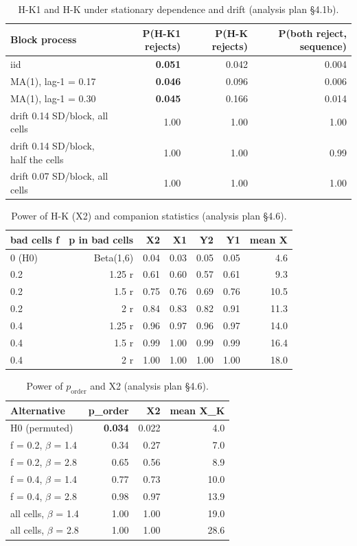 \begin{table}[htbp]
\centering\footnotesize
\caption{H-K1 and H-K under stationary dependence and drift (analysis plan \S4.1b).}\label{tab:sim0}
\begin{tabular}{lrrr}
\toprule
Block process & P(H-K1 rejects) & P(H-K rejects) & P(both reject, sequence) \\
\midrule
iid & \textbf{0.051} & 0.042 & 0.004 \\
MA(1), lag-1 = 0.17 & \textbf{0.046} & 0.096 & 0.006 \\
MA(1), lag-1 = 0.30 & \textbf{0.045} & 0.166 & 0.014 \\
drift 0.14 SD/block, all cells & 1.00 & 1.00 & 1.00 \\
drift 0.14 SD/block, half the cells & 1.00 & 1.00 & 0.99 \\
drift 0.07 SD/block, all cells & 1.00 & 1.00 & 1.00 \\
\bottomrule
\end{tabular}
\end{table}
\begin{table}[htbp]
\centering\footnotesize
\caption{Power of H-K (X2) and companion statistics (analysis plan \S4.6).}\label{tab:sim1}
\begin{tabular}{lrrrrrr}
\toprule
bad cells f & p in bad cells & X2 & X1 & Y2 & Y1 & mean X \\
\midrule
0 (H0) & Beta(1,6) & 0.04 & 0.03 & 0.05 & 0.05 & 4.6 \\
0.2 & 1.25 r & 0.61 & 0.60 & 0.57 & 0.61 & 9.3 \\
0.2 & 1.5 r & 0.75 & 0.76 & 0.69 & 0.76 & 10.5 \\
0.2 & 2 r & 0.84 & 0.83 & 0.82 & 0.91 & 11.3 \\
0.4 & 1.25 r & 0.96 & 0.97 & 0.96 & 0.97 & 14.0 \\
0.4 & 1.5 r & 0.99 & 1.00 & 0.99 & 0.99 & 16.4 \\
0.4 & 2 r & 1.00 & 1.00 & 1.00 & 1.00 & 18.0 \\
\bottomrule
\end{tabular}
\end{table}
\begin{table}[htbp]
\centering\footnotesize
\caption{Power of $p_{\mathrm{order}}$ and X2 (analysis plan \S4.6).}\label{tab:sim2}
\begin{tabular}{lrrr}
\toprule
Alternative & p\_order & X2 & mean X\_K \\
\midrule
H0 (permuted) & \textbf{0.034} & 0.022 & 4.0 \\
f = 0.2, $\beta$ = 1.4 & 0.34 & 0.27 & 7.0 \\
f = 0.2, $\beta$ = 2.8 & 0.65 & 0.56 & 8.9 \\
f = 0.4, $\beta$ = 1.4 & 0.77 & 0.73 & 10.0 \\
f = 0.4, $\beta$ = 2.8 & 0.98 & 0.97 & 13.9 \\
all cells, $\beta$ = 1.4 & 1.00 & 1.00 & 19.0 \\
all cells, $\beta$ = 2.8 & 1.00 & 1.00 & 28.6 \\
\bottomrule
\end{tabular}
\end{table}
